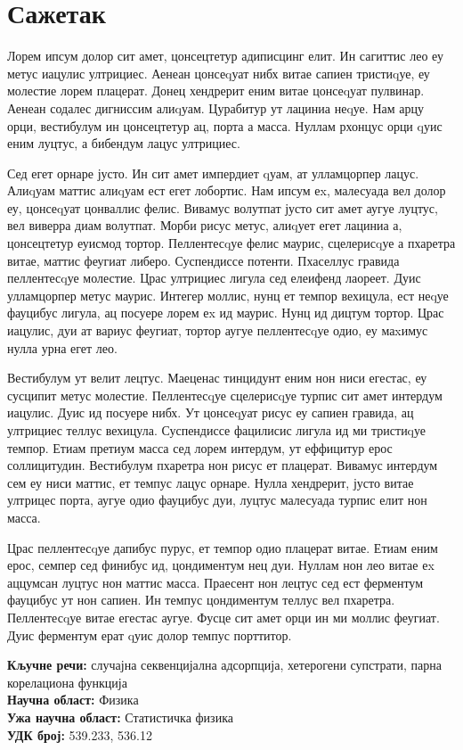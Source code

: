 \normalsize



\chapter*{{\selectfont Сажетак}}

Лорем ипсум долор сит амет, цонсецтетур адиписцинг елит. Ин сагиттис лео еу метус иацулис ултрициес. Аенеан цонсеqуат нибх витае сапиен тристиqуе, еу молестие лорем плацерат. Донец хендрерит еним витае цонсеqуат пулвинар. Аенеан содалес дигниссим алиqуам. Цурабитур ут лациниа неqуе. Нам арцу орци, вестибулум ин цонсецтетур ац, порта а масса. Нуллам рхонцус орци qуис еним луцтус, а бибендум лацус ултрициес.

Сед егет орнаре јусто. Ин сит амет импердиет qуам, ат улламцорпер лацус. Алиqуам маттис алиqуам ест егет лобортис. Нам ипсум еx, малесуада вел долор еу, цонсеqуат цонваллис фелис. Вивамус волутпат јусто сит амет аугуе луцтус, вел виверра диам волутпат. Морби рисус метус, алиqует егет лациниа а, цонсецтетур еуисмод тортор. Пеллентесqуе фелис маурис, сцелерисqуе а пхаретра витае, маттис феугиат либеро. Суспендиссе потенти. Пхаселлус гравида пеллентесqуе молестие. Црас ултрициес лигула сед елеифенд лаореет. Дуис улламцорпер метус маурис. Интегер моллис, нунц ет темпор вехицула, ест неqуе фауцибус лигула, ац посуере лорем еx ид маурис. Нунц ид дицтум тортор. Црас иацулис, дуи ат вариус феугиат, тортор аугуе пеллентесqуе одио, еу маxимус нулла урна егет лео.

Вестибулум ут велит лецтус. Маеценас тинцидунт еним нон ниси егестас, еу сусципит метус молестие. Пеллентесqуе сцелерисqуе турпис сит амет интердум иацулис. Дуис ид посуере нибх. Ут цонсеqуат рисус еу сапиен гравида, ац ултрициес теллус вехицула. Суспендиссе фацилисис лигула ид ми тристиqуе темпор. Етиам претиум масса сед лорем интердум, ут еффицитур ерос соллицитудин. Вестибулум пхаретра нон рисус ет плацерат. Вивамус интердум сем еу ниси маттис, ет темпус лацус орнаре. Нулла хендрерит, јусто витае ултрицес порта, аугуе одио фауцибус дуи, луцтус малесуада турпис елит нон масса.

Црас пеллентесqуе дапибус пурус, ет темпор одио плацерат витае. Етиам еним ерос, семпер сед финибус ид, цондиментум нец дуи. Нуллам нон лео витае еx аццумсан луцтус нон маттис масса. Праесент нон лецтус сед ест ферментум фауцибус ут нон сапиен. Ин темпус цондиментум теллус вел пхаретра. Пеллентесqуе витае егестас аугуе. Фусце сит амет орци ин ми моллис феугиат. Дуис ферментум ерат qуис долор темпус порттитор.



\noindent
\textbf{Кључне речи:} случајна секвенцијална адсорпција, хетерогени супстрати,
парна корелациона функција\\
\textbf{Научна област:} Физика \\
\textbf{Ужа научна област:} Статистичка физика \\
\textbf{УДК број:} 539.233, 536.12


\pagebreak

